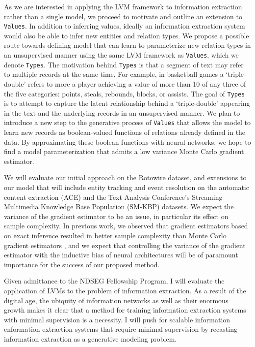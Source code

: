 \documentclass[11pt]{article}
\begin{document}
As we are interested in applying the LVM framework to information extraction rather than a single model,
we proceed to motivate and outline an extension to \texttt{Values}.
In addition to inferring values, ideally an information extraction system 
would also be able to infer new entities and relation types.
We propose a possible route towards defining model that can
learn to parameterize new relation types in an
unsupervised manner using the same LVM framework as \texttt{Values},
which we denote \texttt{Types}.
The motivation behind \texttt{Types} is that a segment of text may refer to multiple records at the same time.
For example, in basketball games a `triple-double' refers to more a player achieving a value of more than 10
of any three of the five categories: points, steals, rebounds, blocks, or assists.
The goal of \texttt{Types} is to attempt to capture the latent relationship behind a `triple-double' appearing in 
the text and the underlying records in an unsupervised manner.
We plan to introduce a new step to the generative process of \texttt{Values} that 
allows the model to learn new records as boolean-valued functions of relations already defined in the data.
By approximating these boolean functions with neural networks, we hope to find a model
parameterization that admits a low variance Monte Carlo gradient estimator.

We will evaluate our initial approach on the Rotowire dataset, and
extensions to our model that will include entity tracking and event resolution on the 
automatic content extraction (ACE) \citep{ace2004} and the Text Analysis Conference's
Streaming Multimedia Knowledge Base Population (SM-KBP) datasets.
We expect the variance of the gradient estimator to be an issue, in particular its
effect on sample complexity. In previous work, we observed that gradient estimators
based on exact inference resulted in better sample complexity than
Monte Carlo gradient estimators \citep{deng2018attn}, and we expect that controlling the variance 
of the gradient estimator with the inductive bias of neural architectures will be of paramount
importance for the success of our proposed method.

Given admittance to the NDSEG Fellowship Program, I will evaluate the application of
LVMs to the problem of information extraction.
As a result of the digital age, the ubiquity of information networks as well as their 
enormous growth makes it clear that a method for training information extraction systems
with minimal supervision is a necessity.
I will push for scalable information enformation extraction systems that require minimal supervision
by recasting information extraction  as a generative modeling problem.
\end{document}
